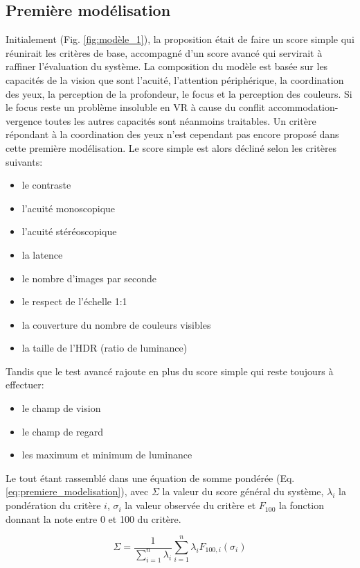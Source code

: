 	\subsection{Première modélisation}
	\par Initialement (Fig. \ref{fig:modèle_1}), la proposition était de faire un score simple qui réunirait les critères de base, accompagné d'un score avancé qui servirait à raffiner l'évaluation du système. La composition du modèle est basée sur les capacités de la vision que sont l'acuité, l'attention périphérique, la coordination des yeux, la perception de la profondeur, le focus et la perception des couleurs. Si le focus reste un problème insoluble en VR à cause du conflit accommodation-vergence toutes les autres capacités sont néanmoins traitables. Un critère répondant à la coordination des yeux n'est cependant pas encore proposé dans cette première modélisation. Le score simple est alors décliné selon les critères suivants:
	\begin{itemize}
		\item le contraste
		\item l'acuité monoscopique
		\item l'acuité stéréoscopique
		\item la latence
		\item le nombre d'images par seconde
		\item le respect de l'échelle 1:1
		\item la couverture du nombre de couleurs visibles
		\item la taille de l'HDR (ratio de luminance)
	\end{itemize}
	Tandis que le test avancé rajoute en plus du score simple qui reste toujours à effectuer:
	\begin{itemize}
		\item le champ de vision
		\item le champ de regard
		\item les maximum et minimum de luminance
	\end{itemize}
	Le tout étant rassemblé dans une équation de somme pondérée (Eq. \ref{eq:premiere_modelisation}), avec $\Sigma$ la valeur du score général du système, $\lambda_i$ la pondération du critère $i$, $\sigma_i$ la valeur observée du critère et $F_{100}$ la fonction donnant la note entre 0 et 100 du critère. 
	
	\begin{equation}
		\Sigma = \frac{1}{\sum_{i = 1}^{n} \lambda_i} \sum_{i = 1}^{n} \lambda_i F_{100,i}(\sigma_i)
		\label{eq:premiere_modelisation}
	\end{equation}
	
